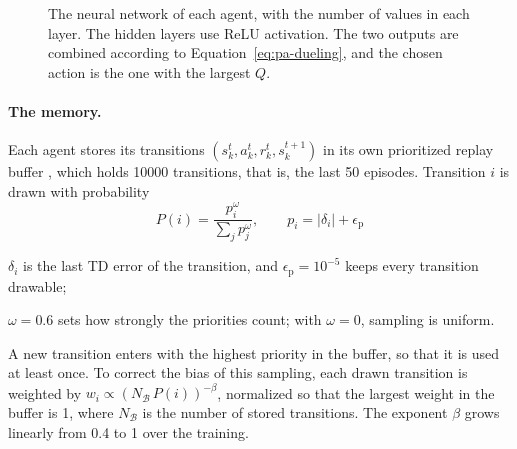 \begin{figure}[tbp]
  \centering
  \caption[The network of each agent]{The neural network of each agent, with the number of values in each
    layer. The hidden layers use ReLU activation. The two outputs are combined according to
    Equation~\ref{eq:pa-dueling}, and the chosen action is the one with the largest $Q$.}
  \label{fig:pa-network}
\end{figure}

\paragraph{The memory.} Each agent stores its transitions
$(s_k^t,\allowbreak a_k^t,\allowbreak r_k^t,\allowbreak s_k^{t+1})$ in its own
prioritized replay buffer \cite{schaul+16per}, which holds \num{10000} transitions, that is, the last 50
episodes. Transition $i$ is drawn with probability
\begin{equation}
  P(i) = \frac{p_i^{\omega}}{\sum_j p_j^{\omega}}, \qquad p_i = |\delta_i| + \epsilon_{\mathrm{p}}
  \label{eq:pa-per}
\end{equation}
\begin{wherelist}
  \item $\delta_i$ is the last \ac{TD} error of the transition, and $\epsilon_{\mathrm{p}} = 10^{-5}$ keeps
    every transition drawable;
  \item $\omega = 0.6$ sets how strongly the priorities count; with $\omega = 0$, sampling is uniform.
\end{wherelist}
A new transition enters with the highest priority in the buffer, so that it is used at least once. To
correct the bias of this sampling, each drawn transition is weighted by
$w_i \propto (N_{\mathcal{B}}\, P(i))^{-\beta}$, normalized so that the largest weight in the buffer is 1,
where $N_{\mathcal{B}}$ is the number of stored transitions. The exponent $\beta$ grows linearly from 0.4 to 1
over the training.

